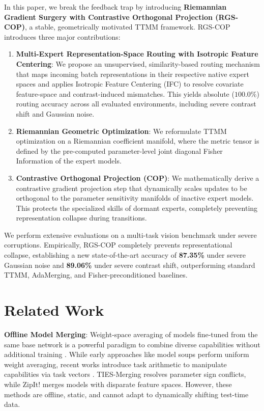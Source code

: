 \documentclass{article}
\theoremstyle{plain}
\theoremstyle{definition}
\theoremstyle{remark}
\begin{document}
In this paper, we break the feedback trap by introducing \textbf{Riemannian Gradient Surgery with Contrastive Orthogonal Projection (RGS-COP)}, a stable, geometrically motivated TTMM framework. RGS-COP introduces three major contributions:
\begin{enumerate}
    \item \textbf{Multi-Expert Representation-Space Routing with Isotropic Feature Centering}: We propose an unsupervised, similarity-based routing mechanism that maps incoming batch representations in their respective native expert spaces and applies Isotropic Feature Centering (IFC) to resolve covariate feature-space and contrast-induced mismatches. This yields absolute ($100.0\%$) routing accuracy across all evaluated environments, including severe contrast shift and Gaussian noise.
    \item \textbf{Riemannian Geometric Optimization}: We reformulate TTMM optimization on a Riemannian coefficient manifold, where the metric tensor is defined by the pre-computed parameter-level joint diagonal Fisher Information of the expert models.
    \item \textbf{Contrastive Orthogonal Projection (COP)}: We mathematically derive a contrastive gradient projection step that dynamically scales updates to be orthogonal to the parameter sensitivity manifolds of inactive expert models. This protects the specialized skills of dormant experts, completely preventing representation collapse during transitions.
\end{enumerate}

We perform extensive evaluations on a multi-task vision benchmark under severe corruptions. Empirically, RGS-COP completely prevents representational collapse, establishing a new state-of-the-art accuracy of \textbf{87.35\%} under severe Gaussian noise and \textbf{89.06\%} under severe contrast shift, outperforming standard TTMM, AdaMerging, and Fisher-preconditioned baselines.

\section{Related Work}
\textbf{Offline Model Merging}: Weight-space averaging of models fine-tuned from the same base network is a powerful paradigm to combine diverse capabilities without additional training \cite{Wortsman2022, Choshen22}. While early approaches like model soups \cite{Wortsman2022} perform uniform weight averaging, recent works introduce task arithmetic to manipulate capabilities via task vectors \cite{Ilharco2022}. TIES-Merging \cite{Yadav2023} resolves parameter sign conflicts, while ZipIt! \cite{Stoica2023} merges models with disparate feature spaces. However, these methods are offline, static, and cannot adapt to dynamically shifting test-time data.
\end{document}
